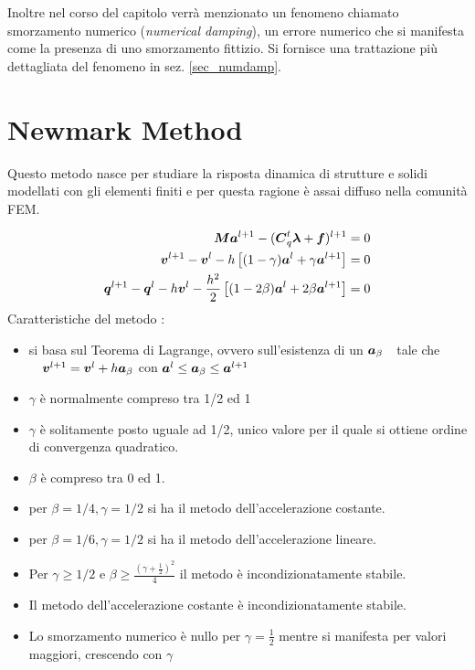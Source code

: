 Inoltre nel corso del capitolo verrà menzionato un fenomeno chiamato smorzamento numerico (\textit{numerical damping}), un errore numerico che si manifesta come la presenza di uno smorzamento fittizio. Si fornisce una trattazione più dettagliata del fenomeno in sez. \ref{sec_numdamp}.
 \section{Newmark Method}
 Questo metodo nasce per studiare la risposta dinamica di strutture e solidi modellati con gli elementi finiti e per questa ragione è assai diffuso nella comunità FEM. %
 
 \begin{align} \label{eq:NewmarkDef}
 {\boldsymbol{M}}{\boldsymbol{a}}^{l+1}-({\boldsymbol{C}}_q^t{\boldsymbol{\lambda}}+{\boldsymbol{f}})^{l+1}&=0 \\
 {\boldsymbol{v}}^{l+1}- {\boldsymbol{v}}^l -h \left[(1-\gamma){\boldsymbol{a}}^l+\gamma {\boldsymbol{a}}^{l+1}\right]&=0 \\
{\boldsymbol{q}}^{l+1}-{\boldsymbol{q}}^l - h {\boldsymbol{v}}^l-\frac{h^2}{2}\left[(1-2\beta){\boldsymbol{a}}^l+2\beta{\boldsymbol{a}}^{l+1}\right]&=0
 \end{align}
 Caratteristiche del metodo \cite{newmark59}:
\begin{itemize}
    \item si basa sul Teorema di Lagrange, ovvero sull'esistenza di un ${\boldsymbol{a}}_{\beta}\quad $tale che $ \quad {\boldsymbol{v}}^{l+1} = {\boldsymbol{v}}^l + h{\boldsymbol{a}}_{\beta}$ con ${\boldsymbol{a}}^l \leq {\boldsymbol{a}}_{\beta} \leq{\boldsymbol{a}}^{l+1}$
    \item $\gamma$ è normalmente compreso tra 1/2 ed 1
    \item $\gamma$ è solitamente posto uguale ad 1/2, unico valore per il quale si ottiene ordine di convergenza quadratico. 
    \item $\beta$ è compreso tra 0 ed 1.
    \item per $\beta =1/4, \gamma= 1/2$ si ha il metodo dell'accelerazione costante.
    \item per $\beta =1/6, \gamma= 1/2$ si ha il metodo dell'accelerazione lineare.
    \item Per $\gamma \geq 1/2$ e $\beta \geq  \frac{(\gamma + \frac{1}{2})^2}{4}$ il metodo è incondizionatamente stabile.
    \item Il metodo dell'accelerazione costante è incondizionatamente stabile.
    \item Lo smorzamento numerico è nullo per $\gamma = \frac{1}{2}$ mentre si manifesta per valori maggiori, crescendo  con $\gamma$

\end{itemize}
